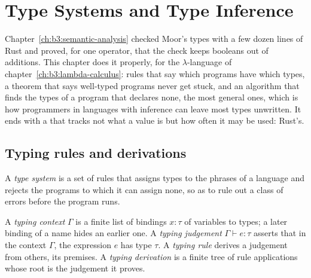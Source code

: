 \chapter{Type Systems and Type Inference}\label{ch:b3:type-systems}

Chapter~\ref{ch:b3:semantic-analysis} checked Moor's types with a few dozen lines of Rust and proved, for one operator, that the check keeps booleans out of additions. This chapter does it properly, for the $\lambda$-language of chapter~\ref{ch:b3:lambda-calculus}: rules that say which programs have which types, a theorem that says well-typed programs never get stuck, and an algorithm that finds the types of a program that declares none, the most general ones, which is how programmers in languages with inference can leave most types unwritten. It ends with a  that tracks not what a value is but how often it may be used: Rust's.

\section{Typing rules and derivations}\label{sec:b3:type-systems:rules}

\begin{definition}\label{def:b3:type-systems:type-system}
A \emph{type system} is a set of rules that assigns types to the phrases of a language and rejects the programs to which it can assign none, so as to rule out a class of errors before the program runs.
\end{definition}

\begin{definition}\label{def:b3:type-systems:judgement}
A \emph{typing context} $\Gamma$ is a finite list of bindings $x : \tau$ of variables to types; a later binding of a name hides an earlier one. A \emph{typing judgement} $\Gamma \vdash e : \tau$ asserts that in the context $\Gamma$, the expression $e$ has type $\tau$. A \emph{typing rule} derives a judgement from others, its premises. A \emph{typing derivation} is a finite tree of rule applications whose root is the judgement it proves.
\end{definition}

